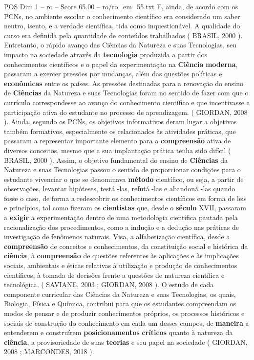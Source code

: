 \begin{textsample}{POS Dim 1 – ro – Score 65.00 – ro/ro\_em\_55.txt}
E, ainda, de acordo com os PCNs, no ambiente escolar o conhecimento científico era considerado um saber neutro, isento, e a verdade científica, tida como inquestionável.
A qualidade do curso era definida pela quantidade de conteúdos trabalhados ( BRASIL, 2000 ).
Entretanto, o rápido avanço das Ciências da Natureza e suas Tecnologias, seu impacto na sociedade através da \textbf{tecnologia} produzida a partir dos conhecimentos científicos e o papel da experimentação na \textbf{Ciência} \textbf{moderna}, passaram a exercer pressões por mudanças, além das questões políticas e \textbf{econômicas} entre os países.
As pressões destinadas para a renovação do ensino de \textbf{Ciências} da Natureza e suas Tecnologias foram no sentido de fazer com que o currículo correspondesse ao avanço do conhecimento científico e que incentivasse a participação ativa do estudante no processo de aprendizagem. ( GIORDAN, 2008 ).
Ainda, segundo os PCNs, os objetivos informativos deram lugar a objetivos também formativos, especialmente os relacionados às atividades práticas, que passaram a representar importante elemento para a \textbf{compreensão} ativa de diversos conceitos, mesmo que a sua implantação prática tenha sido difícil ( BRASIL, 2000 ).
Assim, o objetivo fundamental do ensino de \textbf{Ciências} da Natureza e suas Tecnologias passou o sentido de proporcionar condições para o estudante vivenciar o que se denominava \textbf{método} científico, ou seja, a partir de observações, levantar hipóteses, testá -las, refutá -las e abandoná -las quando fosse o caso, de forma a redescobrir os conhecimentos científicos em forma de leis e princípios, tal como fizeram os \textbf{cientistas} que, desde o \textbf{século} XVII, passaram a \textbf{exigir} a experimentação dentro de uma metodologia científica pautada pela racionalização dos procedimentos, como a indução e a dedução nas práticas de investigação de fenômenos naturais.
Visa, a alfabetização científica, desde a \textbf{compreensão} de conceitos e conhecimentos, da constituição social e histórica da \textbf{ciência}, à \textbf{compreensão} de questões referentes às aplicações e às implicações sociais, ambientais e éticas relativas à utilização e produção de conhecimentos científicos, à tomada de decisões frente a questões de natureza científica e tecnológica. ( SAVIANE, 2003 ; GIORDAN, 2008 ).
O estudo de cada componente curricular das Ciências da Natureza e suas Tecnologias, os quais, Biologia, Física e Química, contribui para que os estudantes compreendam os modos de pensar e de produzir conhecimentos próprios, os processos históricos e sociais de construção do conhecimento em cada um desses campos, de \textbf{maneira} a entenderem e construírem \textbf{posicionamentos} \textbf{críticos} quanto à natureza da \textbf{ciência}, a provisoriedade de suas \textbf{teorias} e seu papel na sociedade ( GIORDAN, 2008 ; MARCONDES, 2018 ).

\end{textsample}
